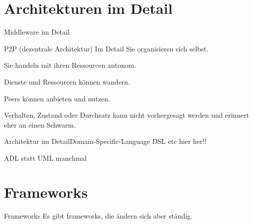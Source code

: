 \documentclass{beamer}
\begin{document}
\section{Architekturen im Detail}

\begin{frame}
	Middleware im Detail

	P2P (dezentrale Architektur) Im Detail
	Sie organisieren sich selbst.

    Sie handeln mit ihren Ressourcen autonom.

    Dienste und Ressourcen können wandern.

    Peers können anbieten und nutzen.

    Verhalten, Zustand oder Durchsatz kann nicht vorhergesagt werden und erinnert eher an einen Schwarm.
\end{frame}

\begin{frame}{Architektur im Detail}{Domain-Specific-Language}
	DSL etc hier her!!
\end{frame}

\begin{frame}
	ADL statt UML manchmal
\end{frame}

\section{Frameworks}

\begin{frame}{Frameworks}
	Es gibt frameworks, die ändern sich aber ständig.
\end{frame}

\end{document}
